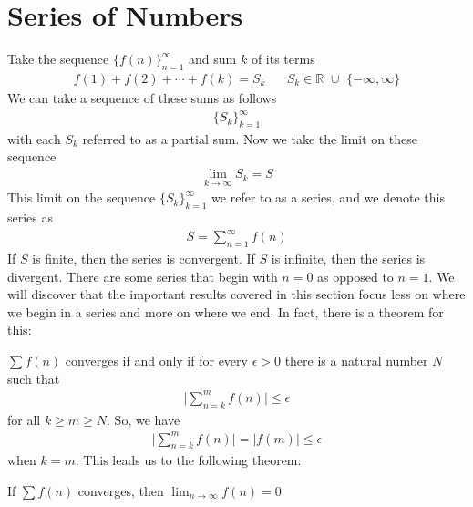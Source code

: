 \section{Series of Numbers}

\begin{definition}
Take the sequence $\{f(n)\}_{n=1}^{\infty}$ and sum $k$ of its terms
\begin{align*}
    f(1) + f(2) + \cdots + f(k) = S_{k} \hspace{20pt} S_{k} \in \mathbb{R} \hspace{4pt} \cup \hspace{4pt} \{-\infty, \infty\}
\end{align*}
We can take a sequence of these sums as follows
\begin{align*}
    \{S_{k}\}_{k=1}^{\infty}
\end{align*}
with each $S_{k}$ referred to as a partial sum. Now we take the limit on these sequence
\begin{align*}
    \lim_{k \longrightarrow \infty} S_{k} = S
\end{align*}
This limit on the sequence $\{S_{k}\}_{k=1}^{\infty}$ we refer to as a series, and we denote this series as 
\begin{align*}
    S = \sum_{n=1}^{\infty} f(n)
\end{align*}
If $S$ is finite, then the series is convergent. If $S$ is infinite, then the series is divergent. There are some series that begin with $n=0$ as opposed to $n=1$. We will discover that the important results covered in this section focus less on where we begin in a series and more on where we end. In fact, there is a theorem for this:
\end{definition}

\begin{theorem}
$\sum f(n)$ converges if and only if for every $\epsilon > 0$ there is a natural number $N$ such that 
\begin{align*}
    \Big\lvert \sum_{n = k}^{m} f(n) \Big\rvert \leq \epsilon
\end{align*}
for all $k \geq m \geq N$. So, we have
\begin{align*}
    \Big\lvert \sum_{n = k}^{m} f(n) \Big\rvert = \lvert f(m) \rvert \leq \epsilon
\end{align*}
when $k = m$. This leads us to the following theorem:
\end{theorem}

\begin{theorem}
If $\sum f(n)$ converges, then $\lim_{n \longrightarrow \infty} f(n) = 0$
\end{theorem}


